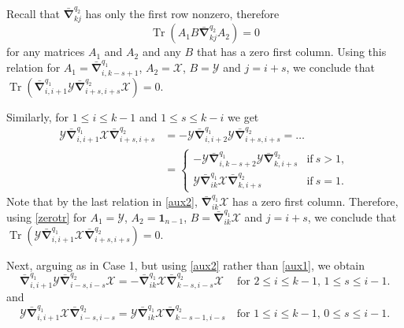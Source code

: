 \documentclass{amsart}
\theoremstyle{definition}
\theoremstyle{remark}
\numberwithin{equation}{section}
\numberwithin{theorem}{section}
\begin{document}
Recall that 
 $ \bar{\boldsymbol\nabla}_{kj}^{q_2}$ has only the first row nonzero, therefore
 \begin{equation}\label{zerotr}
  {\operatorname{Tr}} (A_1B\bar{\boldsymbol\nabla}_{kj}^{q_2}A_2)=0
 \end{equation}
for any matrices $A_1$ and $A_2$ and any $B$ that has a zero first column. Using this relation for 
$A_1=\bar{\boldsymbol\nabla}_{i,k-s+1}^{q_1}$, $A_2= {{\mathcal X}}$, $B={{\mathcal Y}}$ and $j=i+s$, we conclude
 that ${\operatorname{Tr}} (\bar{\boldsymbol\nabla}_{i,i+1}^{q_1} {{\mathcal Y}} \bar{\boldsymbol\nabla}_{i+s,i+s}^{q_2} {{\mathcal X}})=0$.

Similarly, 
for   $1\leq i\leq k-1$ and $1\leq s\leq k-i$  we 
get
\begin{equation*}
\begin{aligned}
{{\mathcal Y}}\bar{\boldsymbol\nabla}_{i,i+1}^{q_1} {{\mathcal X}} \bar{\boldsymbol\nabla}_{i+s,i+s}^{q_2}
&=-{{\mathcal Y}}\bar{\boldsymbol\nabla}_{i,i+2}^{q_1} {{\mathcal Y}} \bar{\boldsymbol\nabla}_{i+s,i+s}^{q_2}
=\ldots\\
&=
\begin{cases} -{{\mathcal Y}}\bar{\boldsymbol\nabla}_{i,k-s+2}^{q_1} {{\mathcal Y}}  \bar{\boldsymbol\nabla}_{k,i+s}^{q_2} &
\mbox{if}\ s >1,\\
{{\mathcal Y}} \bar{\boldsymbol\nabla}_{ik}^{q_1}{{\mathcal X}}   \bar{\boldsymbol\nabla}_{k,i+s}^{q_2} & \mbox{if}\ s=1.
\end{cases}
\end{aligned}
\end{equation*}
Note that by the last relation in \eqref{aux2}, $\bar{\boldsymbol\nabla}_{ik}^{q_1}{{\mathcal X}}$ has a zero
first column. Therefore, using \eqref{zerotr}
for $A_1={{\mathcal Y}}$, $A_2={\mathbf 1}_{n-1}$, $B=\bar{\boldsymbol\nabla}_{ik}^{q_1}{{\mathcal X}}$ and $j=i+s$, we 
conclude that ${\operatorname{Tr}} ({{\mathcal Y}}\bar{\boldsymbol\nabla}_{i,i+1}^{q_1} {{\mathcal X}} \bar{\boldsymbol\nabla}_{i+s,i+s}^{q_2})=0$.

Next, arguing as in Case 1, but using \eqref{aux2} rather than \eqref{aux1}, we obtain
\begin{equation*}
\bar{\boldsymbol\nabla}_{i,i+1}^{q_1} {{\mathcal Y}} \bar{\boldsymbol\nabla}_{i-s,i-s}^{q_2} {{\mathcal X}}=-\bar{\boldsymbol\nabla}_{ik}^{q_1}
{{\mathcal X}} \bar{\boldsymbol\nabla}_{k-s,i-s}^{q_2} {{\mathcal X}}\ 
\quad \text{for $2\leq i\leq k-1$, $1\leq s \leq i-1$}.
\end{equation*}
and
\begin{equation*}
{{\mathcal Y}}\bar{\boldsymbol\nabla}_{i,i+1}^{q_1} {{\mathcal X}} \bar{\boldsymbol\nabla}_{i-s,i-s}^{q_2} =
{{\mathcal Y}}\bar{\boldsymbol\nabla}_{ik}^{q_1} {{\mathcal X}} \bar{\boldsymbol\nabla}_{k-s-1,i-s}^{q_2} 
\quad\text{for $1\leq i\leq k-1$, $0\leq s \leq i-1$}.
\end{equation*}
\end{document}
